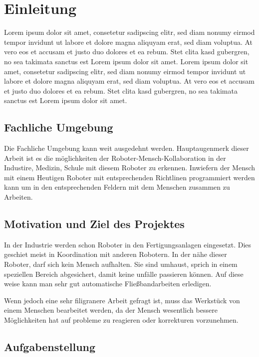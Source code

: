 \chapter{Einleitung}
\label{einleitung}

Lorem ipsum dolor sit amet, consetetur sadipscing elitr, sed diam nonumy eirmod tempor invidunt ut labore et dolore magna aliquyam erat, sed diam voluptua. At vero eos et accusam et justo duo dolores et ea rebum. Stet clita kasd gubergren, no sea takimata sanctus est Lorem ipsum dolor sit amet. Lorem ipsum dolor sit amet, consetetur sadipscing elitr, sed diam nonumy eirmod tempor invidunt ut labore et dolore magna aliquyam erat, sed diam voluptua. At vero eos et accusam et justo duo dolores et ea rebum. Stet clita kasd gubergren, no sea takimata sanctus est Lorem ipsum dolor sit amet.

\section{Fachliche Umgebung}
\label{fachliche_domaene}

Die Fachliche Umgebung kann weit ausgedehnt werden. Hauptaugenmerk dieser Arbeit ist es die möglichkeiten der Roboter-Mensch-Kollaboration
in der Industire, Medizin, Schule mit diesem Roboter zu erkennen.
Inwiefern der Mensch mit einem Heutigen Roboter mit entsprechenden Richtlinen programmiert werden kann um in den entsprechenden Feldern mit dem Menschen zusammen zu Arbeiten.

\section{Motivation und Ziel des Projektes}
\label{projektziel_motivation}

In der Industrie werden schon Roboter in den Fertigungsanlagen eingesetzt. 
Dies geschiet meist in Koordination mit anderen Robotern. In der nähe dieser Roboter, darf sich kein Mensch aufhalten. 
Sie sind umhaust, sprich in einem speziellen Bereich abgesichert, damit keine unfälle passieren können. 
Auf diese weise kann man sehr gut automatische Fließbandarbeiten erledigen.

Wenn jedoch eine sehr filigranere Arbeit gefragt ist, muss das Werkstück von einem Menschen bearbeitet werden, da der Mensch wesentlich bessere Möglichkeiten hat auf probleme zu reagieren oder korrekturen vorzunehmen.

\section{Aufgabenstellung}
\label{aufgabenstellung}

